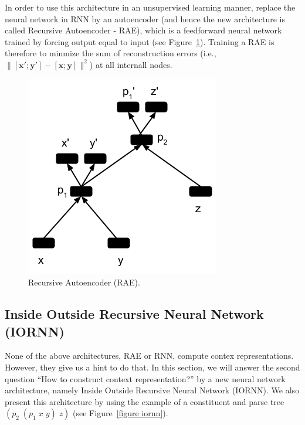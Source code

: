 \documentclass[11pt]{article}
\begin{document}
In order to use this architecture in an unsupervised learning manner, 
 replace the neural network in RNN by an autoencoder 
(and hence the new architecture is called Recursive Autoencoder - RAE), 
which is a feedforward neural network trained by forcing output equal to 
input (see Figure~\ref{figure rae}). Training a RAE is therefore to minmize 
the sum of reconstruction errors 
(i.e., $\|[\mathbf{x}';\mathbf{y}'] - [\mathbf{x};\mathbf{y}]\|^2$) at all internall nodes. 

\begin{figure}[h!]
	\center
	\includegraphics[scale=0.5]{RAE.png}
	\caption{Recursive Autoencoder (RAE).}
	\label{figure rae}
\end{figure}


\subsection{Inside Outside Recursive Neural Network (IORNN)}
\label{subsection nlm}

None of the above architectures, RAE or RNN, compute contex representations. 
However, they give us a hint to do that. In this section, we will answer the second 
question ``How to construct context representation?'' by a new neural network 
architecture, namely Inside Outside Recursive Neural Network (IORNN). We also 
present this architecture by using the example of a constituent and parse tree 
$(p_2 \; (p_1 \; x \; y) \; z)$ (see Figure~\ref{figure iornn}).
\end{document}
